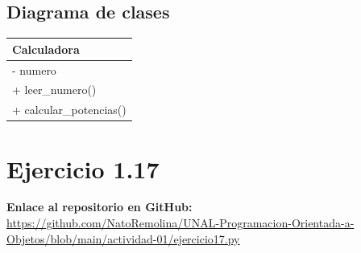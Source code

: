\documentclass[11pt, a4paper]{article}
\newcommand{\clasebox}[3]{%
\begin{center}
\begin{tabular}{|l|}
\hline
\textbf{#1} \\
\hline
#2
\hline
#3
\hline
\end{tabular}
\end{center}
}
\begin{document}
\subsection{Diagrama de clases}
\clasebox{Calculadora}
{%
- numero \\
}
{%
+ leer\_numero() \\
+ calcular\_potencias() \\
}

\newpage
\section{Ejercicio 1.17}

\noindent \textbf{Enlace al repositorio en GitHub:} \\
\url{https://github.com/NatoRemolina/UNAL-Programacion-Orientada-a-Objetos/blob/main/actividad-01/ejercicio17.py}
\end{document}

